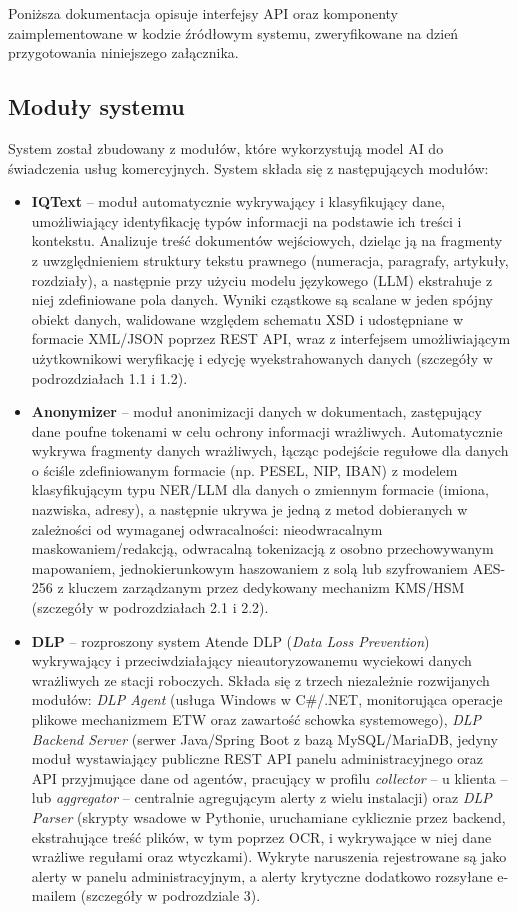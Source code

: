 Poniższa dokumentacja opisuje interfejsy API oraz komponenty zaimplementowane w kodzie źródłowym systemu, zweryfikowane na dzień przygotowania niniejszego załącznika.
\subsection*{Moduły systemu}

System został zbudowany z modułów, które wykorzystują model AI do świadczenia usług komercyjnych. System składa się z następujących modułów:

\begin{itemize}
\item \textbf{IQText} -- moduł automatycznie wykrywający i klasyfikujący dane, umożliwiający identyfikację typów informacji na podstawie ich treści i kontekstu. Analizuje treść dokumentów wejściowych, dzieląc ją na fragmenty z uwzględnieniem struktury tekstu prawnego (numeracja, paragrafy, artykuły, rozdziały), a następnie przy użyciu modelu językowego (LLM) ekstrahuje z niej zdefiniowane pola danych. Wyniki cząstkowe są scalane w jeden spójny obiekt danych, walidowane względem schematu XSD i udostępniane w formacie XML/JSON poprzez REST API, wraz z interfejsem umożliwiającym użytkownikowi weryfikację i edycję wyekstrahowanych danych (szczegóły w podrozdziałach 1.1 i 1.2).
\item \textbf{Anonymizer} -- moduł anonimizacji danych w dokumentach, zastępujący dane poufne tokenami w celu ochrony informacji wrażliwych. Automatycznie wykrywa fragmenty danych wrażliwych, łącząc podejście regułowe dla danych o ściśle zdefiniowanym formacie (np. PESEL, NIP, IBAN) z modelem klasyfikującym typu NER/LLM dla danych o zmiennym formacie (imiona, nazwiska, adresy), a następnie ukrywa je jedną z metod dobieranych w zależności od wymaganej odwracalności: nieodwracalnym maskowaniem/redakcją, odwracalną tokenizacją z osobno przechowywanym mapowaniem, jednokierunkowym haszowaniem z solą lub szyfrowaniem AES-256 z kluczem zarządzanym przez dedykowany mechanizm KMS/HSM (szczegóły w podrozdziałach 2.1 i 2.2).
\item \textbf{DLP} -- rozproszony system Atende DLP (\emph{Data Loss Prevention}) wykrywający i przeciwdziałający nieautoryzowanemu wyciekowi danych wrażliwych ze stacji roboczych. Składa się z trzech niezależnie rozwijanych modułów: \emph{DLP Agent} (usługa Windows w C\#/.NET, monitorująca operacje plikowe mechanizmem ETW oraz zawartość schowka systemowego), \emph{DLP Backend Server} (serwer Java/Spring Boot z bazą MySQL/MariaDB, jedyny moduł wystawiający publiczne REST API panelu administracyjnego oraz API przyjmujące dane od agentów, pracujący w profilu \emph{collector} -- u klienta -- lub \emph{aggregator} -- centralnie agregującym alerty z wielu instalacji) oraz \emph{DLP Parser} (skrypty wsadowe w Pythonie, uruchamiane cyklicznie przez backend, ekstrahujące treść plików, w tym poprzez OCR, i wykrywające w niej dane wrażliwe regułami oraz wtyczkami). Wykryte naruszenia rejestrowane są jako alerty w panelu administracyjnym, a alerty krytyczne dodatkowo rozsyłane e-mailem (szczegóły w podrozdziale 3).

\end{itemize}
